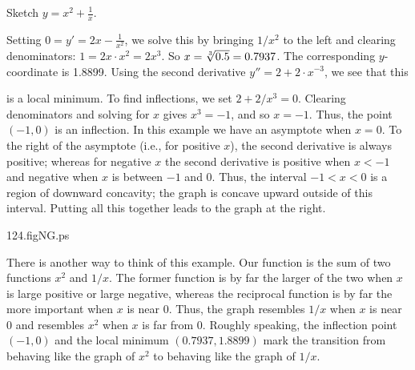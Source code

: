\begin{example}

Sketch $y=x^2+\frac{1}{ x}$.

\smallskip

Setting $0=y'=2x-\frac{1}{ x^2}$, we solve this by bringing $1/x^2$ to the
left and clearing denominators: $1=2x\cdot x^2=2x^3$.  So $x={\root
3\of{0.5}}= 0.7937$.  The corresponding $y$-coordinate is 1.8899.  Using
the second derivative $y''=2+2\cdot x^{-3}$, we see that this 
\begin{rightindent}{3in}
\noindent
is a local minimum.  To find inflections, we set $2+2/x^3=0$.  Clearing
denominators and solving for $x$ gives $x^3=-1$, and so $x=-1$.  Thus, the
point $(-1,0)$ is an inflection.  In this example we have an asymptote when
$x=0$.  To the right of the asymptote (i.e., for positive $x$), the second
derivative is always positive; whereas for negative $x$ the second
derivative is positive when $x<-1$ and negative when $x$ is between $-1$
and $0$.  Thus, the interval $-1<x<0$ is a region of downward concavity;
the graph is concave upward outside of this interval.  Putting all this
together leads to the graph at the right.
\end{rightindent}
\hfill
%
\begin{psfigure}{2.0in}{2.0in}{124.figNG.ps}
\end{psfigure}

\smallskip

There is another way to think of this example.  Our function is the sum of
two functions $x^2$ and $1/x$.  The former function is by far the larger of
the two when $x$ is large positive or large negative, whereas the
reciprocal function is by far the more important when $x$ is near 0.  Thus,
the graph resembles $1/x$ when $x$ is near 0 and resembles $x^2$ when $x$
is far from 0.  Roughly speaking, the inflection point $(-1,0)$ and the
local minimum $(0.7937,1.8899)$ mark the transition from behaving like the
graph of $x^2$ to behaving like the graph of $1/x$.

\end{example}

